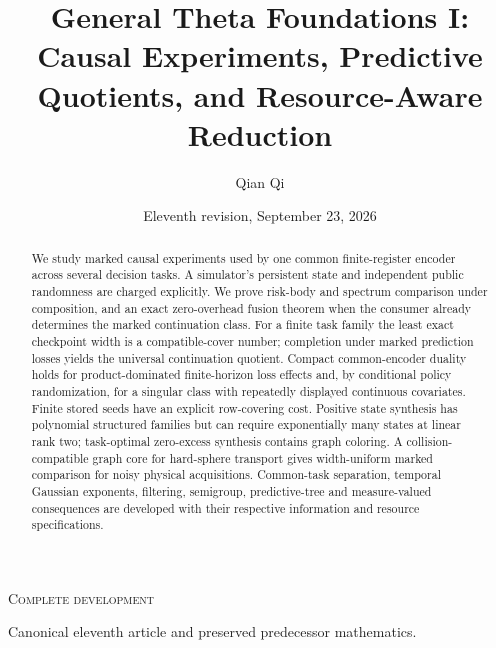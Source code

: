
\newcommand{\Wone}{W_1}
\newcommand{\Del}{\Delta}
\newcommand{\emptyw}{\varnothing}
\newcommand{\osc}{\operatorname{osc}}
\newcommand{\diam}{\operatorname{diam}}
\newcommand{\Lipone}{\operatorname{Lip}_1}
\title[General Theta Foundations I]{General Theta Foundations I: Causal Experiments, Predictive Quotients, and Resource-Aware Reduction}
\author{Qian Qi}
\date{Eleventh revision, September 23, 2026}

\begin{abstract}
We study marked causal experiments used by one common finite-register
encoder across several decision tasks. A simulator's persistent state
and independent public randomness are charged explicitly. We prove risk-body
and spectrum comparison under composition, and an exact zero-overhead
fusion theorem when the consumer already determines the marked continuation
class. For a finite task family the least exact checkpoint width is a
compatible-cover number; completion under marked prediction losses yields
the universal continuation quotient. Compact common-encoder duality holds
for product-dominated finite-horizon loss effects and, by conditional policy
randomization, for a singular class with repeatedly displayed continuous
covariates. Finite stored seeds have an explicit row-covering cost. Positive
state synthesis has polynomial structured families but can require
exponentially many states at linear rank two; task-optimal zero-excess
synthesis contains graph coloring. A collision-compatible graph core for
hard-sphere transport gives width-uniform marked comparison for noisy
physical acquisitions. Common-task separation, temporal Gaussian exponents,
filtering, semigroup, predictive-tree and measure-valued consequences are
developed with their respective information and resource specifications.
\end{abstract}
\maketitle
\ifcomplete
\begin{center}\small\textsc{Complete development}\par
Canonical eleventh article and preserved predecessor mathematics.
\end{center}
\fi
\tableofcontents
